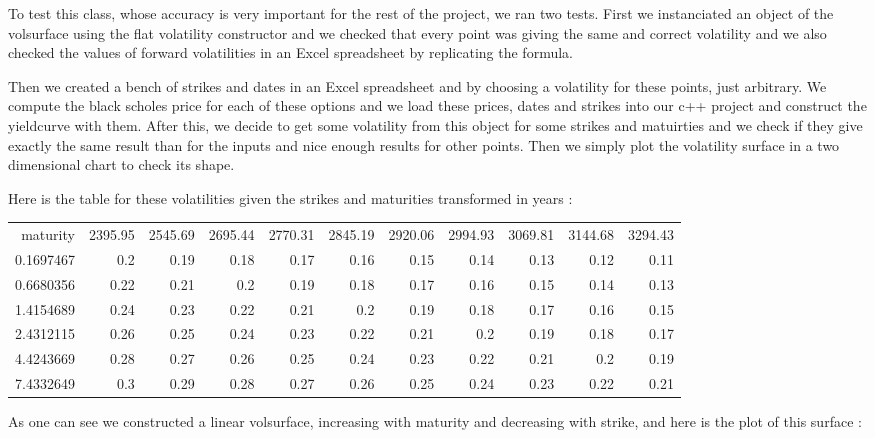 
To test this class, whose accuracy is very important for the rest of the project, we ran two tests. 
First we instanciated an object of the volsurface using the flat volatility constructor and we 
checked that every point was giving the same and correct volatility and we also checked the 
values of forward volatilities in an Excel spreadsheet by replicating the formula. 
\par Then we created a bench of strikes and dates in an Excel spreadsheet and by choosing a volatility 
for these points, just arbitrary. We compute the black scholes price for each of these options 
and we load these prices, dates and strikes into our c++ project and construct the yieldcurve with them. 
After this, we decide to get some volatility from this object for some strikes and matuirties and we check 
if they give exactly the same result than for the inputs and nice enough results for other points.
Then we simply plot the volatility surface in a two dimensional chart to check its shape.
\par Here is the table for these volatilities given the strikes and maturities transformed in years :

\noindent
\begin{tabular}{rrrrrrrrrrr}

  maturity &    2395.95 &    2545.69 &    2695.44 &    2770.31 &    2845.19 &    2920.06 &    2994.93 &    3069.81 &    3144.68 &    3294.43 \\

 0.1697467 &        0.2 &       0.19 &       0.18 &       0.17 &       0.16 &       0.15 &       0.14 &       0.13 &       0.12 &       0.11 \\

 0.6680356 &       0.22 &       0.21 &        0.2 &       0.19 &       0.18 &       0.17 &       0.16 &       0.15 &       0.14 &       0.13 \\

 1.4154689 &       0.24 &       0.23 &       0.22 &       0.21 &        0.2 &       0.19 &       0.18 &       0.17 &       0.16 &       0.15 \\

 2.4312115 &       0.26 &       0.25 &       0.24 &       0.23 &       0.22 &       0.21 &        0.2 &       0.19 &       0.18 &       0.17 \\

 4.4243669 &       0.28 &       0.27 &       0.26 &       0.25 &       0.24 &       0.23 &       0.22 &       0.21 &        0.2 &       0.19 \\

 7.4332649 &        0.3 &       0.29 &       0.28 &       0.27 &       0.26 &       0.25 &       0.24 &       0.23 &       0.22 &       0.21 \\

\end{tabular}  
As one can see we constructed a linear volsurface, increasing with maturity and decreasing with strike, and here is the plot of this surface :

